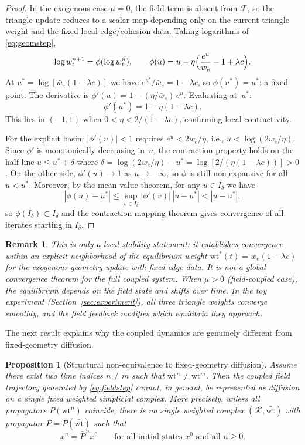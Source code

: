 \documentclass[11pt]{article}
\newtheorem{proposition}[definition]{Proposition}
\newtheorem{remark}[definition]{Remark}
\newcommand{\K}{\mathcal{K}}
\newcommand{\wt}{\mathrm{wt}}
\newcommand{\Flow}{\mathcal{F}}
\begin{document}
\begin{proof}
In the exogenous case $\mu=0$, the field term is absent from $\Flow$, so the triangle update reduces to a scalar map depending only on the current triangle weight and the fixed local edge/cohesion data. Taking logarithms of \eqref{eq:geomstep},
\[
\log w_t^{n+1} = \phi(\log w_t^n),
\qquad
\phi(u)=u-\eta\Bigl(\frac{e^u}{\bar w_e}-1+\lambda c\Bigr).
\]
At $u^\ast=\log[\bar w_e(1-\lambda c)]$ we have $e^{u^\ast}/\bar w_e = 1-\lambda c$, so $\phi(u^\ast)=u^\ast$: a fixed point.  The derivative is $\phi'(u)=1-(\eta/\bar w_e)\,e^u$.  Evaluating at~$u^\ast$:
\[
\phi'(u^\ast)=1-\eta(1-\lambda c).
\]
This lies in $(-1,1)$ when $0<\eta<2/(1-\lambda c)$, confirming local contractivity.

For the explicit basin: $|\phi'(u)|<1$ requires $e^u < 2\bar w_e/\eta$, i.e., $u<\log(2\bar w_e/\eta)$.  Since $\phi'$ is monotonically decreasing in~$u$, the contraction property holds on the half-line $u\le u^\ast + \delta$ where $\delta = \log(2\bar w_e/\eta)-u^\ast = \log[2/(\eta(1-\lambda c))]>0$.  On the other side, $\phi'(u)\to 1$ as $u\to-\infty$, so $\phi$ is still non-expansive for all $u<u^\ast$.  Moreover, by the mean value theorem, for any $u\in I_\delta$ we have
\[
|\phi(u)-u^\ast|\le \sup_{v\in I_\delta}|\phi'(v)|\,|u-u^\ast|<|u-u^\ast|,
\]
so $\phi(I_\delta)\subset I_\delta$ and the contraction mapping theorem gives convergence of all iterates starting in $I_\delta$.
\end{proof}

\begin{remark}
This is only a local stability statement: it establishes convergence within an explicit neighborhood of the equilibrium weight $\wt^\ast(t)=\bar w_e(1-\lambda c)$ for the exogenous geometry update with fixed edge data. It is not a global convergence theorem for the full coupled system. When $\mu>0$ (field-coupled case), the equilibrium depends on the field state and shifts over time. In the toy experiment (Section~\ref{sec:experiment}), all three triangle weights converge smoothly, and the field feedback modifies \emph{which} equilibria they approach.
\end{remark}

The next result explains why the coupled dynamics are genuinely different from fixed-geometry diffusion.

\begin{proposition}[Structural non-equivalence to fixed-geometry diffusion]
Assume there exist two time indices $n\neq m$ such that $\wt^n\neq \wt^m$. Then the coupled field trajectory generated by \eqref{eq:fieldstep} cannot, in general, be represented as diffusion on a single fixed weighted simplicial complex. More precisely, unless all propagators $P(\wt^n)$ coincide, there is no single weighted complex $(\K,\bar{\wt})$ with propagator $\bar P=P(\bar{\wt})$ such that
\[
x^{n}= \bar P^{\,n}x^0
\qquad \text{for all initial states }x^0 \text{ and all }n\ge 0.
\]
\end{proposition}
\end{document}
